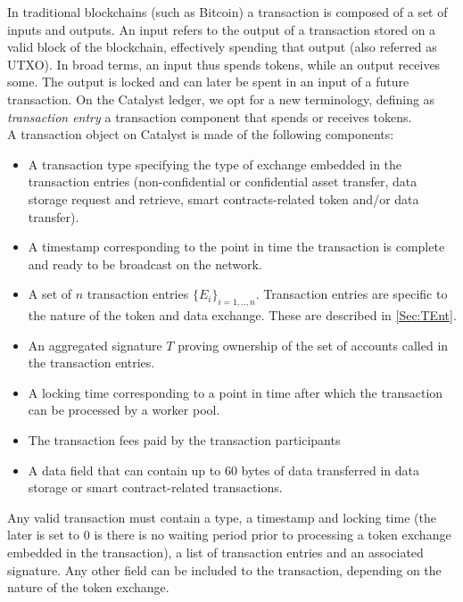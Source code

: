 In traditional blockchains (such as Bitcoin) a transaction is composed of a set of inputs and outputs. An input refers to the output of a transaction stored on a valid block of the blockchain, effectively spending that output (also referred as UTXO). In broad terms, an input thus spends tokens, while an output receives some. The output is locked and can later be spent in an input of a future transaction. On the Catalyst ledger, we opt for a new terminology, defining as \textit{transaction entry} a transaction component that spends or receives tokens.\\

A transaction object on Catalyst is made of the following components:

\begin{itemize}
\item A transaction type specifying the type of exchange embedded in the transaction entries (non-confidential or confidential asset transfer, data storage request and retrieve, smart contracts-related token and/or data transfer).
\item A timestamp corresponding to the point in time the transaction is complete and ready to be broadcast on the network.
\item A set of $n$ transaction entries $\{E_i\}_{i=1,..,n}$. Transaction entries are specific to the nature of the token and data exchange. These are described in \ref{Sec:TEnt}.
\item An aggregated signature $T$ proving ownership of the set of accounts called in the transaction entries.
\item A locking time corresponding to a point in time after which the transaction can be processed by a worker pool.
\item The transaction fees paid by the transaction participants
\item A data field that can contain up to 60 bytes of data transferred in data storage or smart contract-related transactions. 
\end{itemize}

Any valid transaction must contain a type, a timestamp and locking time (the later is set to 0 is there is no waiting period prior to processing a token exchange embedded in the transaction), a list of transaction entries and an associated signature. Any other field can be included to the transaction, depending on the nature of the token exchange. 